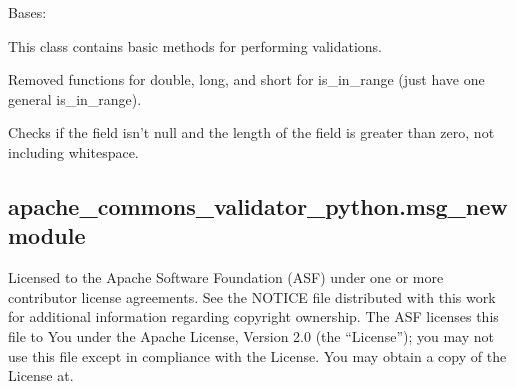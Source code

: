 \documentclass[letterpaper,10pt,english]{sphinxmanual}
\begin{document}
\begin{fulllineitems}
\label{\detokenize{apache_commons_validator_python:apache_commons_validator_python.generic_validator_new.GenericValidator}}
\pysigstartsignatures
{}
\pysigstopsignatures
\sphinxAtStartPar
Bases: 

\sphinxAtStartPar
This class contains basic methods for performing validations.

\sphinxAtStartPar
Removed functions for double, long, and short for is\_in\_range (just have one general
is\_in\_range).

\begin{fulllineitems}
\label{\detokenize{apache_commons_validator_python:apache_commons_validator_python.generic_validator_new.GenericValidator.is_blank_or_null}}
\pysigstartsignatures
{}
\pysigstopsignatures
\sphinxAtStartPar
Checks if the field isn’t null and the length of the field is greater than
zero, not including whitespace.

\end{fulllineitems}


\end{fulllineitems}



\subsection{apache\_commons\_validator\_python.msg\_new module}
\label{\detokenize{apache_commons_validator_python:module-apache_commons_validator_python.msg_new}}\label{\detokenize{apache_commons_validator_python:apache-commons-validator-python-msg-new-module}}
\sphinxAtStartPar
Licensed to the Apache Software Foundation (ASF) under one or more contributor
license agreements.  See the NOTICE file distributed with this work for additional
information regarding copyright ownership. The ASF licenses this file to You under the
Apache License, Version 2.0 (the “License”); you may not use this file except in
compliance with the License.  You may obtain a copy of the License at.
\end{document}
